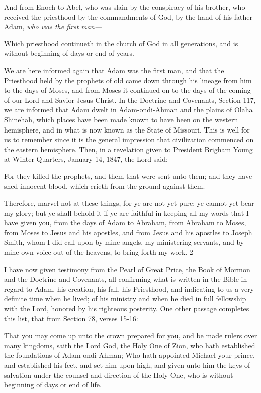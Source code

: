 And from Enoch to Abel, who was slain by the conspiracy of his brother, who received the
priesthood by the commandments of God, by the hand of his father Adam, \textit{who was the first
man—}

Which priesthood continueth in the church of God in all generations, and is without
beginning of days or end of years.

We are here informed again that Adam was the first man, and that the Priesthood held by the
prophets of old came down through his lineage from him to the days of Moses, and from
Moses it continued on to the days of the coming of our Lord and Savior Jesus Christ. In the
Doctrine and Covenants, Section 117, we are informed that Adam dwelt in Adam-ondi-Ahman
and the plains of Olaha Shinehah, which places have been made known to have been
on the western hemisphere, and in what is now known as the State of Missouri. This is well
for us to remember since it is the general impression that civilization commenced on the
eastern hemisphere. Then, in a revelation given to President Brigham Young at Winter
Quarters, January 14, 1847, the Lord said:

For they killed the prophets, and them that were sent unto them; and they have shed innocent
blood, which crieth from the ground against them.

Therefore, marvel not at these things, for ye are not yet pure; ye cannot yet bear my glory;
but ye shall behold it if ye are faithful in keeping all my words that I have given you, from
the days of Adam to Abraham, from Abraham to Moses, from Moses to Jesus and his
apostles, and from Jesus and his apostles to Joseph Smith, whom I did call upon by mine
angels, my ministering servants, and by mine own voice out of the heavens, to bring forth my
work. 2

I have now given testimony from the Pearl of Great Price, the Book of Mormon and the
Doctrine and Covenants, all confirming what is written in the Bible in regard to Adam, his
creation, his fall, his Priesthood, and indicating to us a very definite time when he lived; of
his ministry and when he died in full fellowship with the Lord, honored by his righteous
posterity. One other passage completes this list, that from Section 78, verses 15-16:

That you may come up unto the crown prepared for you, and be made rulers over many
kingdoms, saith the Lord God, the Holy One of Zion, who hath established the foundations of
Adam-ondi-Ahman; Who hath appointed Michael your prince, and established his feet, and
set him upon high, and given unto him the keys of salvation under the counsel and direction
of the Holy One, who is without beginning of days or end of life.


